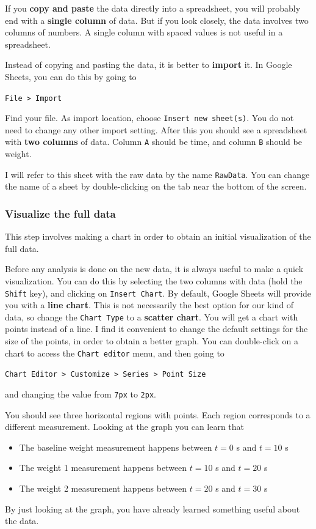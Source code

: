 If you \textbf{copy and paste} the data directly into a spreadsheet, you will probably end with a \textbf{single column} of data. But if you look closely, the data involves two columns of numbers. A single column with spaced values is not useful in a spreadsheet.

Instead of copying and pasting the data, it is better to \textbf{import} it. In Google Sheets, you can do this by going to
\begin{center}
    \texttt{File > Import}
\end{center}
Find your file. As import location, choose \texttt{Insert new sheet(s)}. You do not need to change any other import setting. After this you should see a spreadsheet with \textbf{two columns} of data. Column \texttt{A} should be time, and column \texttt{B} should be weight.

I will refer to this sheet with the raw data by the name \texttt{RawData}. You can change the name of a sheet by double-clicking on the tab near the bottom of the screen.
\subsubsection{Visualize the full data}
This step involves making a chart in order to obtain an initial visualization of the full data.

Before any analysis is done on the new data, it is always useful to make a quick visualization. You can do this by selecting the two columns with data (hold the \texttt{Shift} key), and clicking on \texttt{Insert Chart}. By default, Google Sheets will provide you with a \textbf{line chart}. This is not necessarily the best option for our kind of data, so change the \texttt{Chart Type} to a \textbf{scatter chart}. You will get a chart with points instead of a line. I find it convenient to change the default settings for the size of the points, in order to obtain a better graph. You can double-click on a chart to access the \texttt{Chart editor} menu, and then going to
\begin{center}
    \texttt{Chart Editor > Customize > Series > Point Size}
\end{center}
and changing the value from \texttt{7px} to \texttt{2px}.

You should see three horizontal regions with points. Each region corresponds to a different measurement. Looking at the graph you can learn that
\begin{itemize}
    \item The baseline weight measurement happens between $t = 0$ s and $t = 10$ s
    \item The weight 1 measurement happens between $t = 10$ s and $t = 20$ s
    \item The weight 2 measurement happens between $t = 20$ s and $t = 30$ s
\end{itemize}
By just looking at the graph, you have already learned something useful about the data.
